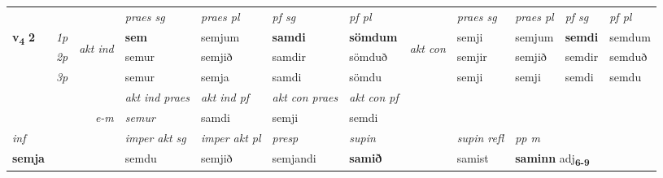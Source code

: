 \begin{longtable}[l]{X>{\footnotesize\itshape}llXXXXlXXXX}
\midrule

 & &   & \textit{praes sg}  & \textit{praes pl}    & \textit{ pf sg} & \textit{pf pl} & & \textit{praes sg}  & \textit{praes pl}    & \textit{pf sg} & \textit{pf pl }  \\ \cmidrule{4-7} \cmidrule{9-12}
 \multirow{2}{*}{{{\textbf{v{\textsubscript{4}}} \Large{\textbf{2}}}}}  & 1p & \multirow{3}{*}{\begin{turn}{90}\textit{akt ind}\end{turn}} & \textbf{sem} & semjum & \textbf{samdi} & \textbf{sömdum} & \multirow{3}{*}{\begin{turn}{90}\textit{akt con}\end{turn}} &semji & semjum & \textbf{semdi} & semdum\\*
 & 2p &  &  semur  & semjið & samdir & sömduð & & semjir & semjið & semdir & semduð \\*
 & 3p &  & semur & semja & samdi & sömdu & & semji & semji& semdi & semdu \\*
\cmidrule{4-7} \cmidrule{9-12}

   && &  \textit{akt ind praes} & \textit{akt ind pf} & \textit{akt con praes} & \textit{akt con pf} \\*
\multicolumn{3}{r}{\textit{e-m}} & semur & samdi & semji & semdi \\*

\cmidrule{4-7}
   {\textit{inf}} & &  & \textit{imper akt sg} & \textit{imper akt pl}   & \textit{presp} & \textit{supin} && \textit{supin refl} & \textit{pp m} \\*
  {\textbf{semja}} & && semdu  & semjið   & semjandi &  \textbf{samið} && samist & \multicolumn{2}{l}{\textbf{saminn} adj\textbf{\textsubscript{6-9}}} \\*

\midrule


\end{longtable}
